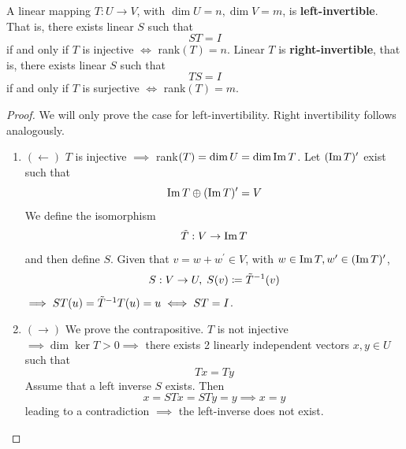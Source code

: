   \begin{theorem}
    \label{thm:left-right-invertibility}
    A linear mapping $T: U \to V$, with $\dim{U} = n, \dim{V} = m$, is \textbf{left-invertible}. That is, there exists linear $S$ such that 
    \begin{equation}
      S T = I
    \end{equation}
    if and only if $T$ is injective $\iff$ rank$(T) = n$. Linear $T$ is \textbf{right-invertible}, that is, there exists linear $S$ such that 
    \begin{equation}
      T S = I
    \end{equation}
    if and only if $T$ is surjective $\iff$ rank$(T) = m$. 
  \end{theorem}
  \begin{proof}
    We will only prove the case for left-invertibility. Right invertibility follows analogously. 
    \begin{enumerate}
      \item $(\leftarrow)$ $T$ is injective $\implies$ rank$(T) = \dim{U} = \dim{\operatorname{Im}{T}}$. Let $(\operatorname{Im}{T})^\prime$ exist such that 
      \begin{equation}
        \operatorname{Im}{T} \oplus (\operatorname{Im}{T})^\prime = V
      \end{equation}
      We define the isomorphism 
      \begin{equation}
        \Tilde{T}: V \to \operatorname{Im}{T}
      \end{equation}
      and then define $S$. Given that $v = w + w^\prime \in V$, with $w \in \operatorname{Im}{T}, w^\prime \in (\operatorname{Im}{T})^\prime$, 
      \begin{equation}
        S : V \to U, \; S(v) \coloneqq \Tilde{T}^{-1} (v)
      \end{equation}
      $\implies S T (u) = \Tilde{T}^{-1} T (u) = u \iff S T = I$. 

      \item $(\rightarrow)$ We prove the contrapositive. $T$ is not injective $\implies \dim{\ker{T}} > 0 \implies $ there exists 2 linearly independent vectors $x, y \in U$ such that
      \begin{equation}
        T x = T y
      \end{equation}
      Assume that a left inverse $S$ exists. Then 
      \begin{equation}
        x = S T x = S T y = y \implies x = y
      \end{equation}
      leading to a contradiction $\implies$ the left-inverse does not exist. 
    \end{enumerate}
  \end{proof}

